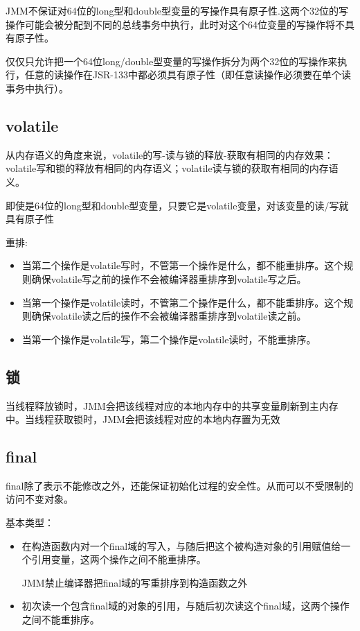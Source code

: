 JMM不保证对64位的long型和double型变量的写操作具有原子性.这两个32位的写操作可能会被分配到不同的总线事务中执行，此时对这个64位变量的写操作将不具有原子性。

仅仅只允许把一个64位long/double型变量的写操作拆分为两个32位的写操作来执行，任意的读操作在JSR-133中都必须具有原子性（即任意读操作必须要在单个读事务中执行）。

\subsection{volatile}

从内存语义的角度来说，volatile的写-读与锁的释放-获取有相同的内存效果：volatile写和锁的释放有相同的内存语义；volatile读与锁的获取有相同的内存语义。

即使是64位的long型和double型变量，只要它是volatile变量，对该变量的读/写就具有原子性


重排:
\begin{itemize}
\item 当第二个操作是volatile写时，不管第一个操作是什么，都不能重排序。这个规则确保volatile写之前的操作不会被编译器重排序到volatile写之后。
\item 当第一个操作是volatile读时，不管第二个操作是什么，都不能重排序。这个规则确保volatile读之后的操作不会被编译器重排序到volatile读之前。
\item 当第一个操作是volatile写，第二个操作是volatile读时，不能重排序。
\end{itemize}


\subsection{锁}

当线程释放锁时，JMM会把该线程对应的本地内存中的共享变量刷新到主内存中。当线程获取锁时，JMM会把该线程对应的本地内存置为无效


\subsection{final}

final除了表示不能修改之外，还能保证初始化过程的安全性。从而可以不受限制的访问不变对象。

基本类型：
\begin{itemize}
\item 在构造函数内对一个final域的写入，与随后把这个被构造对象的引用赋值给一个引用变量，这两个操作之间不能重排序。

JMM禁止编译器把final域的写重排序到构造函数之外

\item 初次读一个包含final域的对象的引用，与随后初次读这个final域，这两个操作之间不能重排序。
\end{itemize}

